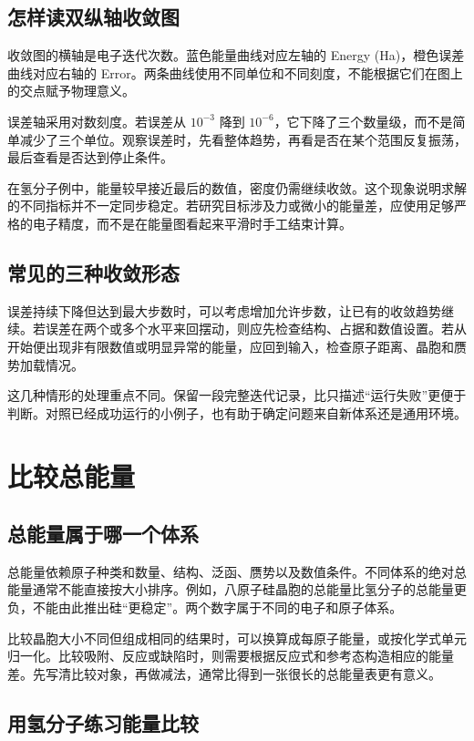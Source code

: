 \subsection{怎样读双纵轴收敛图}

收敛图的横轴是电子迭代次数。蓝色能量曲线对应左轴的 Energy (Ha)，橙色误差曲线对应右轴的 Error。两条曲线使用不同单位和不同刻度，不能根据它们在图上的交点赋予物理意义。

误差轴采用对数刻度。若误差从 $10^{-3}$ 降到 $10^{-6}$，它下降了三个数量级，而不是简单减少了三个单位。观察误差时，先看整体趋势，再看是否在某个范围反复振荡，最后查看是否达到停止条件。

在氢分子例中，能量较早接近最后的数值，密度仍需继续收敛。这个现象说明求解的不同指标并不一定同步稳定。若研究目标涉及力或微小的能量差，应使用足够严格的电子精度，而不是在能量图看起来平滑时手工结束计算。

\subsection{常见的三种收敛形态}

误差持续下降但达到最大步数时，可以考虑增加允许步数，让已有的收敛趋势继续。若误差在两个或多个水平来回摆动，则应先检查结构、占据和数值设置。若从开始便出现非有限数值或明显异常的能量，应回到输入，检查原子距离、晶胞和赝势加载情况。

这几种情形的处理重点不同。保留一段完整迭代记录，比只描述“运行失败”更便于判断。对照已经成功运行的小例子，也有助于确定问题来自新体系还是通用环境。

\section{比较总能量}

\subsection{总能量属于哪一个体系}

总能量依赖原子种类和数量、结构、泛函、赝势以及数值条件。不同体系的绝对总能量通常不能直接按大小排序。例如，八原子硅晶胞的总能量比氢分子的总能量更负，不能由此推出硅“更稳定”。两个数字属于不同的电子和原子体系。

比较晶胞大小不同但组成相同的结果时，可以换算成每原子能量，或按化学式单元归一化。比较吸附、反应或缺陷时，则需要根据反应式和参考态构造相应的能量差。先写清比较对象，再做减法，通常比得到一张很长的总能量表更有意义。

\subsection{用氢分子练习能量比较}

